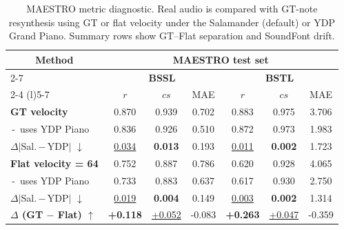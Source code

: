 \documentclass{article}
\begin{document}
\begin{table}[htbp]
\centering
\setlength{\tabcolsep}{0.7pt}
\small
\renewcommand{\arraystretch}{1.2}
\begin{tabular}{l||ccc|ccc}
    \toprule
    \multicolumn{1}{c||}{\multirow{3}{*}{\textbf{Method}}}
    & \multicolumn{6}{c}{\textbf{MAESTRO test set}} \\
    \cmidrule(l){2-7}
    & \multicolumn{3}{c|}{\textbf{BSSL}} & \multicolumn{3}{c}{\textbf{BSTL}} \\
    \cmidrule(lr){2-4} \cmidrule(l){5-7}
    & $r$ & $cs$ & MAE & $r$ & $cs$ & MAE \\
    \midrule
    \textbf{GT velocity}            & 0.870 & 0.939 & 0.702 & 0.883 & 0.975 & 3.706 \\
    \,-\, uses YDP Piano            & 0.836 & 0.926 & 0.510 & 0.872 & 0.973 & 1.983 \\
    $\Delta\lvert$Sal.\,$-$\,YDP$\rvert$ $\downarrow$
                                    & \underline{0.034} & \textbf{0.013} & 0.193
                                    & \underline{0.011} & \textbf{0.002} & 1.723 \\
    \midrule
    \textbf{Flat velocity = 64}     & 0.752 & 0.887 & 0.786 & 0.620 & 0.928 & 4.065 \\
    \,-\, uses YDP Piano \,            & 0.733 & 0.883 & 0.637 & 0.617 & 0.930 & 2.750 \\
    $\Delta\lvert$Sal.\,$-$\,YDP$\rvert$ $\downarrow$
                                    & \underline{0.019} & \textbf{0.004} & 0.149
                                    & \underline{0.003} & \textbf{0.002} & 1.314 \\
    \midrule
    \textbf{$\Delta$ (GT $-$ Flat) $\uparrow$}
                                    & \textbf{+0.118} & \underline{+0.052} & -0.083
                                    & \textbf{+0.263} & \underline{+0.047} & -0.359 \\
    \bottomrule
\end{tabular}
\caption{MAESTRO metric diagnostic. Real audio is compared with GT-note resynthesis using GT or flat velocity under the Salamander (default) or YDP Grand Piano. Summary rows show GT--Flat separation and SoundFont drift.}
\label{tab:metric_diagnostic}
\end{table}

 
\end{document}
